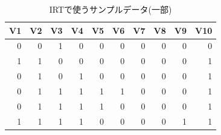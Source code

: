 \begin{table}[ht]
	\caption{IRTで使うサンプルデータ(一部)}
	\centering
	\begin{tabular}[t]{rrrrrrrrrr}
		\hline
		V1 & V2 & V3 & V4 & V5 & V6 & V7 & V8 & V9 & V10 \\
		\hline
		0  & 0  & 1  & 0  & 0  & 0  & 0  & 0  & 0  & 0   \\
		1  & 1  & 0  & 0  & 0  & 0  & 0  & 0  & 0  & 1   \\
		0  & 1  & 0  & 1  & 0  & 0  & 0  & 0  & 0  & 1   \\
		0  & 1  & 1  & 1  & 1  & 1  & 0  & 0  & 0  & 1   \\
		0  & 1  & 1  & 1  & 1  & 0  & 0  & 0  & 0  & 1   \\
		1  & 1  & 1  & 1  & 0  & 0  & 0  & 0  & 1  & 1   \\
		\hline
	\end{tabular}
	\label{tbl::11_01}
\end{table}
